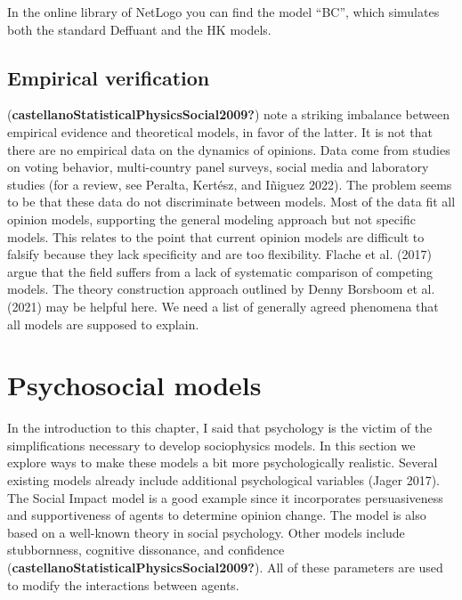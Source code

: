 \documentclass[
  a4paper,
  DIV=11,
  numbers=noendperiod,
  oneside]{scrreprt}
\begin{document}
In the online library of NetLogo you can find the model ``BC'', which
simulates both the standard Deffuant and the HK models.

\hypertarget{sec-Empirical-verification}{%
\subsection{Empirical verification}\label{sec-Empirical-verification}}

(\textbf{castellanoStatisticalPhysicsSocial2009?}) note a striking
imbalance between empirical evidence and theoretical models, in favor of
the latter. It is not that there are no empirical data on the dynamics
of opinions. Data come from studies on voting behavior, multi-country
panel surveys, social media and laboratory studies (for a review, see
Peralta, Kertész, and Iñiguez 2022). The problem seems to be that these
data do not discriminate between models. Most of the data fit all
opinion models, supporting the general modeling approach but not
specific models. This relates to the point that current opinion models
are difficult to falsify because they lack specificity and are too
flexibility. Flache et al. (2017) argue that the field suffers from a
lack of systematic comparison of competing models. The theory
construction approach outlined by Denny Borsboom et al. (2021) may be
helpful here. We need a list of generally agreed phenomena that all
models are supposed to explain.

\hypertarget{sec-Psychosocial-models}{%
\section{Psychosocial models}\label{sec-Psychosocial-models}}

In the introduction to this chapter, I said that psychology is the
victim of the simplifications necessary to develop sociophysics models.
In this section we explore ways to make these models a bit more
psychologically realistic. Several existing models already include
additional psychological variables (Jager 2017). The Social Impact model
is a good example since it incorporates persuasiveness and
supportiveness of agents to determine opinion change. The model is also
based on a well-known theory in social psychology. Other models include
stubbornness, cognitive dissonance, and confidence
(\textbf{castellanoStatisticalPhysicsSocial2009?}). All of these
parameters are used to modify the interactions between agents.
\end{document}
